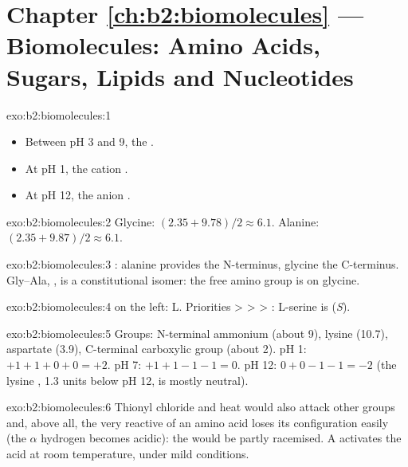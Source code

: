 \section*{Chapter \ref{ch:b2:biomolecules} --- Biomolecules: Amino Acids, Sugars, Lipids and Nucleotides}

\begin{solution}{exo:b2:biomolecules:1}
\begin{itemize}
  \item Between pH 3 and 9, the  .
  \item At pH 1, the cation .
  \item At pH 12, the anion .
\end{itemize}
\end{solution}

\begin{solution}{exo:b2:biomolecules:2}
Glycine: $(2.35 + 9.78)/2 \approx 6.1$. Alanine: $(2.35 + 9.87)/2 \approx 6.1$.
\end{solution}

\begin{solution}{exo:b2:biomolecules:3}
: alanine provides the N-terminus, glycine the C-terminus. Gly--Ala,
, is a constitutional isomer: the free amino group is on glycine.
\end{solution}

\begin{solution}{exo:b2:biomolecules:4}
 on the left: L. Priorities  >  >  > : L-serine is
(\textit{S}).
\end{solution}

\begin{solution}{exo:b2:biomolecules:5}
Groups: N-terminal ammonium (about 9), lysine  (10.7), aspartate  (3.9),
C-terminal carboxylic group (about 2). pH 1: $+1 +1 + 0 + 0 = +2$. pH 7: $+1 +1 -1 -1 = 0$. pH 12:
$0 + 0 - 1 - 1 = -2$ (the lysine , 1.3 units below pH 12, is mostly neutral).
\end{solution}

\begin{solution}{exo:b2:biomolecules:6}
Thionyl chloride and heat would also attack other groups and, above all, the very reactive 
of an amino acid loses its configuration easily (the $\alpha$ hydrogen becomes acidic): the  would
be partly racemised. A  activates the acid at room temperature, under mild conditions.
\end{solution}


